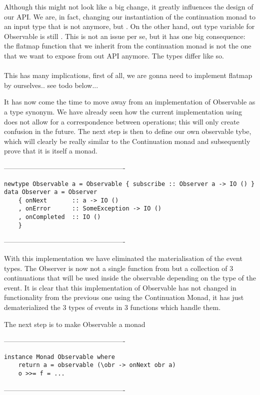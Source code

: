 Although this might not look like a big change, it greatly influences the design of our API. We are, in fact, changing our instantiation of the continuation monad to an input type that is not  anymore, but . On the other hand, out type variable for Observable is still . This is not an issue per se, but it has one big consequence: the flatmap function that we inherit from the continuation monad is not the one that we want to expose from out API anymore. The types differ like so.\\

\\

This has many implications, first of all, we are gonna need to implement flatmap by ourselves.. see todo below...

It has now come the time to move away from an implementation of Observable as a type synonym. We have already seen how the current implementation using  does not allow for a correspondence between \code{>>=} operations; this will only create confusion in the future. The next step is then to define our own observable tybe, which will clearly be really similar to the Continuation monad and subsequently prove that it is itself a monad. 

----------------------------------------------------
\begin{verbatim}
newtype Observable a = Observable { subscribe :: Observer a -> IO () } 
data Observer a = Observer 
    { onNext       :: a -> IO ()
    , onError      :: SomeException -> IO ()
    , onCompleted  :: IO ()
    }
\end{verbatim}
----------------------------------------------------    

With this implementation we have eliminated the materialisation of the event types. The Observer is now not a single function from  but a collection of 3 continuations that will be used inside the observable depending on the type of the event. It is clear that this implementation of Observable has not changed in functionality from the previous one using the Continuation Monad, it has just dematerialized the 3 types of events in 3 functions which handle them.

The next step is to make Observable a monad

----------------------------------------------------
\begin{verbatim}
instance Monad Observable where
	return a = observable (\obr -> onNext obr a)
	o >>= f = ...
\end{verbatim}
----------------------------------------------------  

